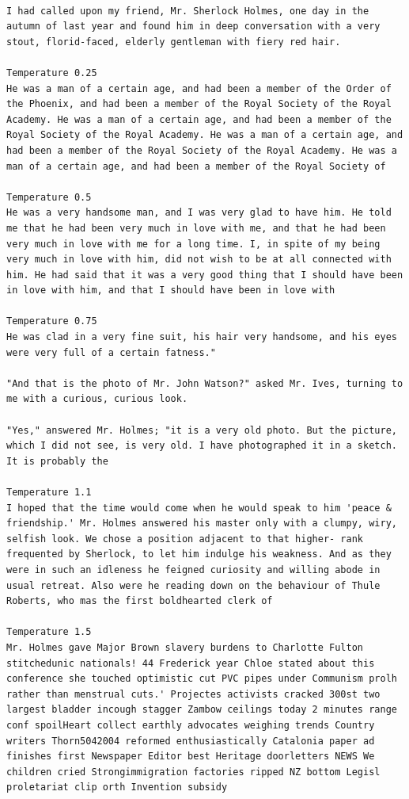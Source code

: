 \documentclass[../labs.tex]{subfiles}
\begin{document}
\hypertarget{out:lab03-gpt2-c15}{}\label{out:lab03-gpt2-c15}

\begin{lstlisting}[style=terminalOutput,breakatwhitespace=false,columns=fullflexible]

I had called upon my friend, Mr. Sherlock Holmes, one day in the autumn of last year and found him in deep conversation with a very stout, florid-faced, elderly gentleman with fiery red hair.

Temperature 0.25
He was a man of a certain age, and had been a member of the Order of the Phoenix, and had been a member of the Royal Society of the Royal Academy. He was a man of a certain age, and had been a member of the Royal Society of the Royal Academy. He was a man of a certain age, and had been a member of the Royal Society of the Royal Academy. He was a man of a certain age, and had been a member of the Royal Society of

Temperature 0.5
He was a very handsome man, and I was very glad to have him. He told me that he had been very much in love with me, and that he had been very much in love with me for a long time. I, in spite of my being very much in love with him, did not wish to be at all connected with him. He had said that it was a very good thing that I should have been in love with him, and that I should have been in love with

Temperature 0.75
He was clad in a very fine suit, his hair very handsome, and his eyes were very full of a certain fatness."

"And that is the photo of Mr. John Watson?" asked Mr. Ives, turning to me with a curious, curious look.

"Yes," answered Mr. Holmes; "it is a very old photo. But the picture, which I did not see, is very old. I have photographed it in a sketch. It is probably the

Temperature 1.1
I hoped that the time would come when he would speak to him 'peace & friendship.' Mr. Holmes answered his master only with a clumpy, wiry, selfish look. We chose a position adjacent to that higher- rank frequented by Sherlock, to let him indulge his weakness. And as they were in such an idleness he feigned curiosity and willing abode in usual retreat. Also were he reading down on the behaviour of Thule Roberts, who mas the first boldhearted clerk of

Temperature 1.5
Mr. Holmes gave Major Brown slavery burdens to Charlotte Fulton stitchedunic nationals! 44 Frederick year Chloe stated about this conference she touched optimistic cut PVC pipes under Communism prolh rather than menstrual cuts.' Projectes activists cracked 300st two largest bladder incough stagger Zambow ceilings today 2 minutes range conf spoilHeart collect earthly advocates weighing trends Country writers Thorn5042004 reformed enthusiastically Catalonia paper ad finishes first Newspaper Editor best Heritage doorletters NEWS We children cried Strongimmigration factories ripped NZ bottom Legisl proletariat clip orth Invention subsidy

\end{lstlisting}
\end{document}
